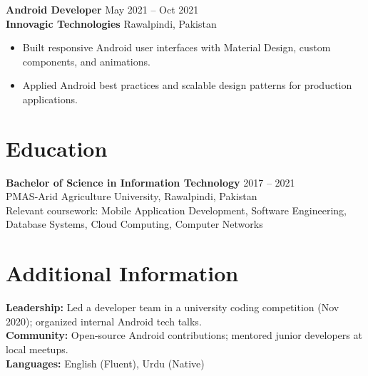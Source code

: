 \documentclass[11pt,letterpaper]{article}
\begin{document}
\textbf{Android Developer} \hfill May 2021 -- Oct 2021\\
\textbf{Innovagic Technologies} \hfill Rawalpindi, Pakistan
\begin{itemize}
  \item Built responsive Android user interfaces with Material Design, custom components, and animations.
  \item Applied Android best practices and scalable design patterns for production applications.
\end{itemize}

\section*{Education}
\textbf{Bachelor of Science in Information Technology} \hfill 2017 -- 2021\\
PMAS-Arid Agriculture University, Rawalpindi, Pakistan\\
Relevant coursework: Mobile Application Development, Software Engineering, Database Systems, Cloud Computing, Computer Networks

\section*{Additional Information}
\textbf{Leadership:} Led a developer team in a university coding competition (Nov 2020); organized internal Android tech talks.\\
\textbf{Community:} Open-source Android contributions; mentored junior developers at local meetups.\\
\textbf{Languages:} English (Fluent), Urdu (Native)
\end{document}
